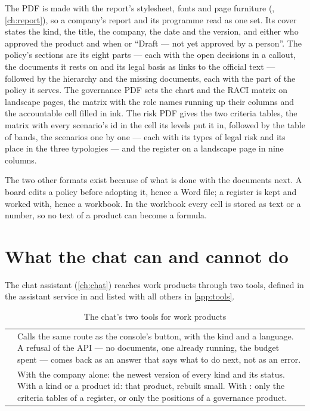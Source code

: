 The PDF is made with the report's stylesheet, fonts and page furniture
(, \cref{ch:report}), so a company's report and its programme read as
one set. Its cover states the kind, the title, the company, the date and the version, and
either who approved the product and when or \enquote{Draft --- not yet approved by a person}.
The policy's sections are its eight parts --- each with the open decisions in a callout, the
documents it rests on and its legal basis as links to the official text --- followed by the
hierarchy and the missing documents, each with the part of the policy it serves. The governance PDF sets the chart and the RACI matrix on
landscape pages, the matrix with the role names running up their columns and the accountable
cell filled in ink. The risk PDF gives the two criteria tables, the matrix with every
scenario's id in the cell its levels put it in, followed by the table of bands, the scenarios
one by one --- each with its types of legal risk and its place in the three typologies ---
and the register on a landscape page in nine columns.

The two other formats exist because of what is done with the documents next. A board edits a
policy before adopting it, hence a Word file; a register is kept and worked with, hence a
workbook. In the workbook every cell is stored as text or a number, so no text of a product
can become a formula.


\section{What the chat can and cannot do}\label{sec:programme:chat}

The chat assistant (\cref{ch:chat}) reaches work products through two tools, defined in the
assistant service in  and listed with all others in
\cref{app:tools}.

\begin{table}[H]
\caption{The chat's two tools for work products}\label{tab:programme:chat}
\begin{tabularx}{\textwidth}{@{}L{34mm}Y@{}}
\toprule
{} &  \\
\midrule
{} & Calls the same route as the console's button, with the kind and a language. A refusal of the API --- no documents, one already running, the budget spent --- comes back as an answer that says what to do next, not as an error. \\
 & With the company alone: the newest version of every kind and its status. With a kind or a product id: that product, rebuilt small. With : only the criteria tables of a register, or only the positions of a governance product. \\
\bottomrule
\end{tabularx}
\end{table}

